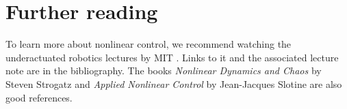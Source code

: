 \section{Further reading}

To learn more about nonlinear control, we recommend watching the underactuated
robotics lectures by MIT \cite{bib:underactuated_videos}. Links to it and the
associated lecture note \cite{bib:underactuated_book} are in the bibliography.
The books \textit{Nonlinear Dynamics and Chaos} by Steven Strogatz and
\textit{Applied Nonlinear Control} by Jean-Jacques Slotine are also good
references.
